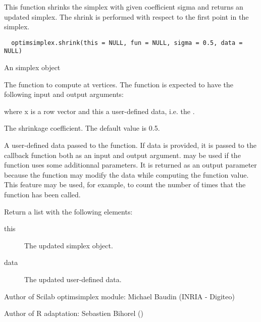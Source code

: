 %
\begin{Description}\relax
This function shrinks the simplex with given coefficient sigma and returns an
updated simplex. The shrink is performed with respect to the first point in
the simplex.
\end{Description}
%
\begin{Usage}
\begin{verbatim}
  optimsimplex.shrink(this = NULL, fun = NULL, sigma = 0.5, data = NULL)
\end{verbatim}
\end{Usage}
%
\begin{Arguments}
\begin{ldescription}
\item[\code{this}] An simplex object
\item[\code{fun}] The function to compute at vertices. The function is expected to
have the following input and output arguments:

where x is a row vector and this a user-defined data, i.e. the .
\item[\code{sigma}] The shrinkage coefficient. The default value is 0.5.
\item[\code{data}] A user-defined data passed to the function. If data is provided,
it is passed to the callback function both as an input and output argument.
 may be used if the function uses some additionnal parameters. It
is returned as an output parameter because the function may modify the data
while computing the function value. This feature may be used, for example,
to count the number of times that the function has been called.
\end{ldescription}
\end{Arguments}
%
\begin{Value}
Return a list with the following elements: \begin{description}

\item[this] The updated simplex object.
\item[data] The updated user-defined data.

\end{description}

\end{Value}
%
\begin{Author}\relax
Author of Scilab optimsimplex module: Michael Baudin (INRIA - Digiteo)

Author of R adaptation: Sebastien Bihorel ()
\end{Author}
%
\begin{SeeAlso}\relax
{}
\end{SeeAlso}
